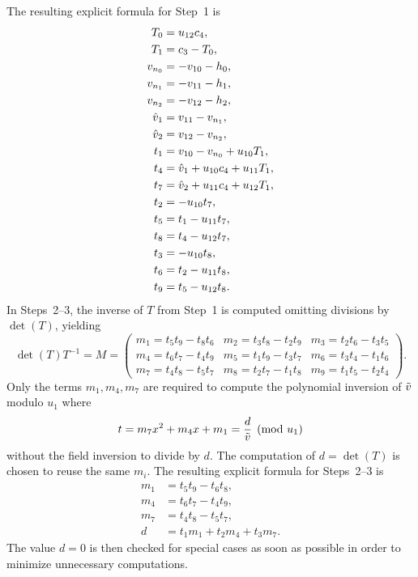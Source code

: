 The resulting explicit formula for Step~1 is
\begin{align*}
    T_0  &= u_{12}c_4,\\
    T_1  &= c_3 - T_0,\\
    v_{n_0} &= -v_{10} - h_0,\\
    v_{n_1} &= -v_{11} - h_1,\\    
    v_{n_2} &= -v_{12} - h_2,\\
    \hat{v}_1 &= v_{11} - v_{n_1},\\
    \hat{v}_2 &= v_{12} - v_{n_2},\\
    t_1 &= v_{10} - v_{n_0} + u_{10}T_1,\\
    t_4 &= \hat{v}_1 + u_{10}c_4 + u_{11}T_1,\\
    t_7 &= \hat{v}_2 + u_{11}c_4 + u_{12}T_1,\\
    t_2 &= -u_{10}t_7,\\
    t_5 &= t_1 - u_{11}t_7,\\
    t_8 &= t_4 - u_{12}t_7,\\
    t_3 &= -u_{10}t_8,\\
    t_6 &= t_2 - u_{11}t_8,\\
    t_9 &= t_5 - u_{12}t_8.
\end{align*}
In Steps~2--3, the inverse of $T$ from Step~1 is computed omitting divisions by $\det(T)$, yielding
$$ \det(T)T^{-1} = M = \left( \begin{array}{ccc}
m_1 = t_5t_9 - t_8t_6 & m_2 = t_3t_8 - t_2t_9 & m_3 = t_2t_6 - t_3t_5  \\
m_4 = t_6t_7 - t_4t_9 & m_5 = t_1t_9 - t_3t_7 & m_6 = t_3t_4 - t_1t_6  \\
m_7 = t_4t_8 - t_5t_7 & m_8 = t_2t_7 - t_1t_8 & m_9 = t_1t_5 - t_2t_4
\end{array} \right).$$ 
Only the terms $m_1,m_4,m_7$ are required to compute the polynomial inversion of
$\tilde{v}$ modulo $u_1$ where $$ t = m_7x^2 + m_4x + m_1 = \frac{d}{\tilde{v}}
\pmod{u_1}$$ without the field inversion to divide by $d$. The computation of $d = \det(T)$ is
chosen to reuse the same $m_i$. The resulting explicit formula for Steps~2--3 is
\begin{align*}
    m_1 &= t_5t_9 - t_6t_8,\\
    m_4 &= t_6t_7 - t_4t_9,\\
    m_7 &= t_4t_8 - t_5t_7,\\
    d   &= t_1m_1 + t_2m_4 + t_3m_7. 
\end{align*} 
The value $d = 0$ is then checked for special cases as soon as possible in order
to minimize unnecessary computations. 

